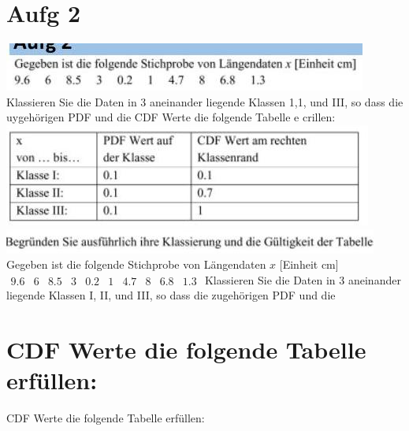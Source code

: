 \documentclass[10pt]{article}
\begin{document}
{\section*{Aufg 2}
\includegraphics[max width=\textwidth, center]{2024_12_29_0906b02acf849bda8665g-5(15)}\\
Klassieren Sie die Daten in 3 aneinander liegende Klassen 1,1, und III, so dass die uygehörigen PDF und die CDF Werte die folgende Tabelle e crillen:\\
\includegraphics[max width=\textwidth, center]{2024_12_29_0906b02acf849bda8665g-5(2)}\\
\includegraphics[max width=\textwidth, center]{2024_12_29_0906b02acf849bda8665g-5(13)}\\
Gegeben ist die folgende Stichprobe von Längendaten $x$ [Einheit cm] $\begin{array}{llllllllll}9.6 & 6 & 8.5 & 3 & 0.2 & 1 & 4.7 & 8 & 6.8 & 1.3\end{array}$ Klassieren Sie die Daten in 3 aneinander liegende Klassen I, II, und III, so dass die zugehörigen PDF und die

\section*{CDF Werte die folgende Tabelle erfüllen:}
CDF Werte die folgende Tabelle erfüllen:

}
\end{document}
